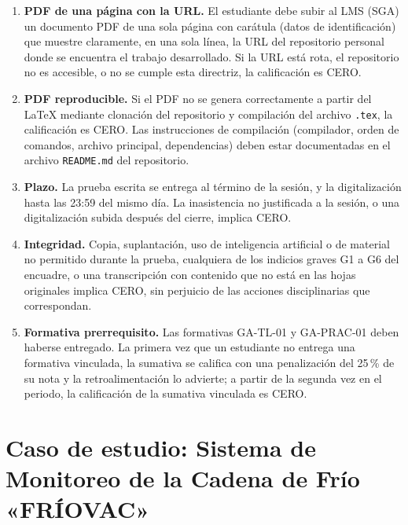 \documentclass[11pt]{article}
\newcommand{\seccion}[1]{\section{\textcolor{utegreendk}{#1}}}
\begin{document}
	\begin{cajapiso}[title={Criterios de piso: el incumplimiento de cualquiera implica calificación 0,0/10}]
		\begin{enumerate}[label=\textbf{P\arabic*.},leftmargin=24pt,itemsep=3pt]
			\item \textbf{PDF de una página con la URL.} El estudiante debe subir al LMS (SGA) un documento PDF de una sola página con carátula (datos de identificación) que muestre claramente, en una sola línea, la URL del repositorio personal donde se encuentra el trabajo desarrollado. Si la URL está rota, el repositorio no es accesible, o no se cumple esta directriz, la calificación es CERO.
			\item \textbf{PDF reproducible.} Si el PDF no se genera correctamente a partir del \LaTeX{} mediante clonación del repositorio y compilación del archivo \texttt{.tex}, la calificación es CERO. Las instrucciones de compilación (compilador, orden de comandos, archivo principal, dependencias) deben estar documentadas en el archivo \texttt{README.md} del repositorio.
			\item \textbf{Plazo.} La prueba escrita se entrega al término de la sesión, y la digitalización hasta las 23:59 del mismo día. La inasistencia no justificada a la sesión, o una digitalización subida después del cierre, implica CERO.
			\item \textbf{Integridad.} Copia, suplantación, uso de inteligencia artificial o de material no permitido durante la prueba, cualquiera de los indicios graves G1 a G6 del encuadre, o una transcripción con contenido que no está en las hojas originales implica CERO, sin perjuicio de las acciones disciplinarias que correspondan.
			\item \textbf{Formativa prerrequisito.} Las formativas GA-TL-01 y GA-PRAC-01 deben haberse entregado. La primera vez que un estudiante no entrega una formativa vinculada, la sumativa se califica con una penalización del 25\,\% de su nota y la retroalimentación lo advierte; a partir de la segunda vez en el periodo, la calificación de la sumativa vinculada es CERO.
		\end{enumerate}
	\end{cajapiso}
	
	\seccion{Caso de estudio: Sistema de Monitoreo de la Cadena de Frío «FRÍOVAC»}
	
\end{document}
